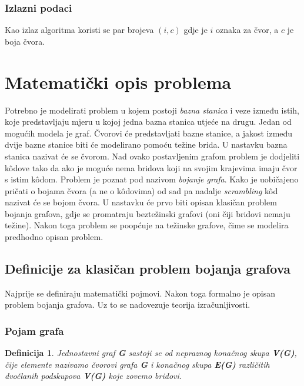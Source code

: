 \documentclass[times, utf8, diplomski, numeric]{fer}
\newtheorem{definition}{Definicija}
\begin{document}
\subsubsection{Izlazni podaci}

Kao izlaz algoritma koristi se par brojeva $(i, c)$ gdje je $i$ oznaka za čvor, a $c$ je boja čvora.

\section{Matematički opis problema}

Potrebno je modelirati problem u kojem postoji \emph{bazna stanica} i veze između istih, koje predstavljaju mjeru u kojoj jedna bazna stanica utjeće na drugu. Jedan od mogućih modela je graf. Čvorovi će predstavljati bazne stanice, a jakost između dvije bazne stanice biti će modelirano pomoću težine brida. U nastavku bazna stanica nazivat će se čvorom. Nad ovako postavljenim grafom problem je dodjeliti k\^{o}dove tako da ako je moguće nema bridova koji na svojim krajevima imaju čvor s istim k\^{o}dom. Problem je poznat pod nazivom \emph{bojanje grafa}. Kako je uobičajeno pričati o bojama čvora (a ne o k\^{o}dovima) od sad pa nadalje \emph{scrambling} k\^{o}d nazivat će se bojom čvora. U nastavku će prvo biti opisan klasičan problem bojanja grafova, gdje se promatraju beztežinski grafovi (oni čiji bridovi nemaju težine). Nakon toga problem se poopćuje na težinske grafove, čime se modelira predhodno opisan problem.

\subsection{Definicije za klasičan problem bojanja grafova}

Najprije se definiraju matematički pojmovi. Nakon toga formalno je opisan problem bojanja grafova. Uz to se nadovezuje teorija izračunljivosti.

\subsubsection{Pojam grafa}

\begin{definition}
Jednostavni graf \textbf{G} sastoji se od nepraznog konačnog skupa \textbf{V(G)}, čije elemente nazivamo čvorovi grafa \textbf{G} i konačnog skupa \textbf{E(G)} različitih dvočlanih podskupova \textbf{V(G)} koje zovemo bridovi.
\end{definition}
\end{document}
